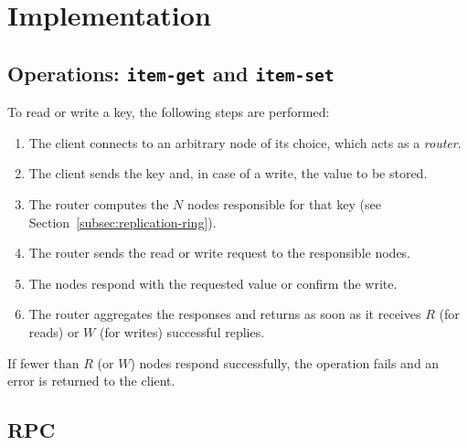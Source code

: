 \section{Implementation}
\label{sec:implementation}

%
%

\subsection{Operations: \texttt{item-get} and \texttt{item-set}}
\label{subsec:get-set}

To read or write a key, the following steps are performed:
\begin{enumerate}
    \item The client connects to an arbitrary node of its choice, which acts as
    a \emph{router}.
    \item The client sends the key and, in case of a write, the value to be
    stored.
    \item The router computes the $N$ nodes responsible for that key
    (see Section~\ref{subsec:replication-ring}).
    \item The router sends the read or write request to the responsible nodes.
    \item The nodes respond with the requested value or confirm the write.
    \item The router aggregates the responses and returns as soon as it
    receives $R$ (for reads) or $W$ (for writes) successful
    replies.
\end{enumerate}

If fewer than $R$ (or $W$) nodes respond successfully, the
operation fails and an error is returned to the client.





\subsection{RPC}
\label{subsec:rpc}

